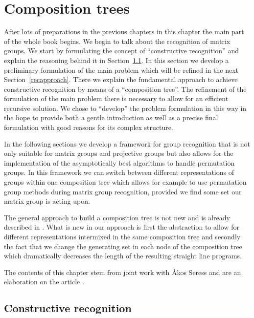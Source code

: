 
\chapter{Composition trees}

After lots of preparations in the previous chapters
in this chapter the main part of the whole book begins. We begin to talk
about the recognition of matrix groups. We start by formulating
the concept of ``constructive recognition'' and explain the reasoning
behind it in Section~\ref{constrrecog}. In this section we develop
a preliminary formulation of the main problem which will be refined
in the next Section~\ref{recapproach}. There we explain the fundamental
approach to achieve
constructive recognition by means of a ``composition tree''.
The refinement of the formulation of the main
problem there is necessary to allow for an efficient recursive solution.
We chose to ``develop'' the problem formulation in this way in the hope
to provide both a gentle introduction as well as a precise final
formulation with good reasons for its complex structure.

In the following sections we develop a
framework for group recognition that is not only suitable for matrix
groups and projective groups but also allows for the implementation of
the asymptotically best algorithms to handle permutation groups. In
this framework we can switch between different representations of
groups within one composition tree which allows for example to use 
permutation group methods during matrix group recognition, provided
we find some set our matrix group is acting upon.

The general approach to build a composition tree is not new and is
already described in \cite{MatGrpProj}. What is new in our approach
is first the abstraction to allow for different representations
intermixed in the same composition tree and secondly the fact that
we change the generating set in each node of the composition tree
which dramatically decreases the length of the resulting straight
line programs. 

The contents of this chapter stem from joint work with \'Akos Seress
and are an elaboration on the article \cite{AkosMaxISSAC}.

\section{Constructive recognition}
\label{constrrecog}

